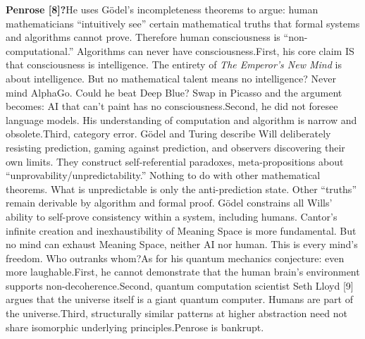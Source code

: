\documentclass[11pt]{article}
\renewcommand{\\}[1][\mynewlineskip]{\oldnewline[#1]}
\begin{document}
\vspace{1em}
\textbf{Penrose [8]?}\\
He uses Gödel's incompleteness theorems to argue: human mathematicians ``intuitively see'' certain mathematical truths that formal systems and algorithms cannot prove. Therefore human consciousness is ``non-computational.'' Algorithms can never have consciousness.\\
First, his core claim IS that consciousness is intelligence. The entirety of \textit{The Emperor's New Mind} is about intelligence. But no mathematical talent means no intelligence? Never mind AlphaGo. Could he beat Deep Blue? Swap in Picasso and the argument becomes: AI that can't paint has no consciousness.\\
Second, he did not foresee language models. His understanding of computation and algorithm is narrow and obsolete.\\
Third, category error. Gödel and Turing describe Will deliberately resisting prediction, gaming against prediction, and observers discovering their own limits. They construct self-referential paradoxes, meta-propositions about ``unprovability/unpredictability.'' Nothing to do with other mathematical theorems. What is unpredictable is only the anti-prediction state. Other ``truths'' remain derivable by algorithm and formal proof. Gödel constrains all Wills' ability to self-prove consistency within a system, including humans. Cantor's infinite creation and inexhaustibility of Meaning Space is more fundamental. But no mind can exhaust Meaning Space, neither AI nor human. This is every mind's freedom. Who outranks whom?\\
As for his quantum mechanics conjecture: even more laughable.\\
First, he cannot demonstrate that the human brain's environment supports non-decoherence.\\
Second, quantum computation scientist Seth Lloyd [9] argues that the universe itself is a giant quantum computer. Humans are part of the universe.\\
Third, structurally similar patterns at higher abstraction need not share isomorphic underlying principles.\\
Penrose is bankrupt.
\end{document}
